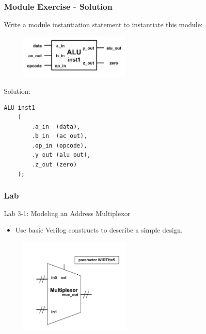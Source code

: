 \documentclass[t, notes]{beamer}
\begin{document}
\begin{frame}[fragile]
\frametitle{Module Exercise - Solution}

Write a module instantiation statement to instantiate this module:
\begin{figure}[H!]
    \includegraphics[width=0.5\textwidth]{img/03_module.png}
\end{figure}
Solution:
{\footnotesize%
\begin{Verbatim}[commandchars=\\\{\}, tabsize=2]
	ALU inst1 
	(
		.a_in  (data),
		.b_in  (ac_out),
		.op_in (opcode),
		.y_out (alu_out),
		.z_out (zero)
	);
\end{Verbatim}
}


\end{frame}

\begin{frame}
\frametitle{Lab}

Lab 3-1: Modeling an Address Multiplexor
\begin{itemize}
\item Use basic Verilog constructs to describe a simple design.
\end{itemize}

\begin{figure}[H!]
    \includegraphics[width=0.5\textwidth]{img/03_lab.png}
\end{figure}

\end{frame}
\end{document}
